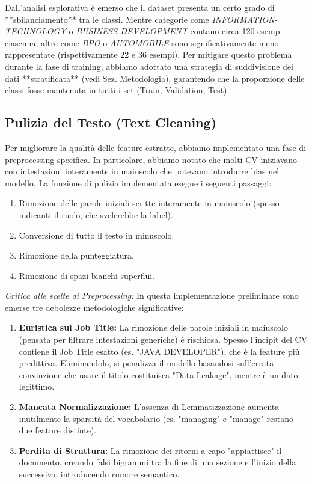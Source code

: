 \documentclass[a4paper,12pt]{article}
\begin{document}
Dall'analisi esplorativa è emerso che il dataset presenta un certo grado di **sbilanciamento** tra le classi. Mentre categorie come \textit{INFORMATION-TECHNOLOGY} o \textit{BUSINESS-DEVELOPMENT} contano circa 120 esempi ciascuna, altre come \textit{BPO} o \textit{AUTOMOBILE} sono significativamente meno rappresentate (rispettivamente 22 e 36 esempi). Per mitigare questo problema durante la fase di training, abbiamo adottato una strategia di suddivisione dei dati **stratificata** (vedi Sez. Metodologia), garantendo che la proporzione delle classi fosse mantenuta in tutti i set (Train, Validation, Test).

\subsection{Pulizia del Testo (Text Cleaning)}
Per migliorare la qualità delle feature estratte, abbiamo implementato una fase di preprocessing specifica. In particolare, abbiamo notato che molti CV iniziavano con intestazioni interamente in maiuscolo che potevano introdurre bias nel modello.
La funzione di pulizia implementata esegue i seguenti passaggi:
\begin{enumerate}
    \item Rimozione delle parole iniziali scritte interamente in maiuscolo (spesso indicanti il ruolo, che svelerebbe la label).
    \item Conversione di tutto il testo in minuscolo.
    \item Rimozione della punteggiatura.
    \item Rimozione di spazi bianchi superflui.
\end{enumerate}

\textit{Critica alle scelte di Preprocessing:} In questa implementazione preliminare sono emerse tre debolezze metodologiche significative:
\begin{enumerate}
    \item \textbf{Euristica sui Job Title:} La rimozione delle parole iniziali in maiuscolo (pensata per filtrare intestazioni generiche) è rischiosa. Spesso l'incipit del CV contiene il Job Title esatto (es. "JAVA DEVELOPER"), che è la feature più predittiva. Eliminandolo, si penalizza il modello basandosi sull'errata convinzione che usare il titolo costituisca "Data Leakage", mentre è un dato legittimo.
    \item \textbf{Mancata Normalizzazione:} L'assenza di Lemmatizzazione aumenta inutilmente la sparsità del vocabolario (es. "managing" e "manage" restano due feature distinte).
    \item \textbf{Perdita di Struttura:} La rimozione dei ritorni a capo "appiattisce" il documento, creando falsi bigrammi tra la fine di una sezione e l'inizio della successiva, introducendo rumore semantico.
\end{enumerate}
\end{document}
